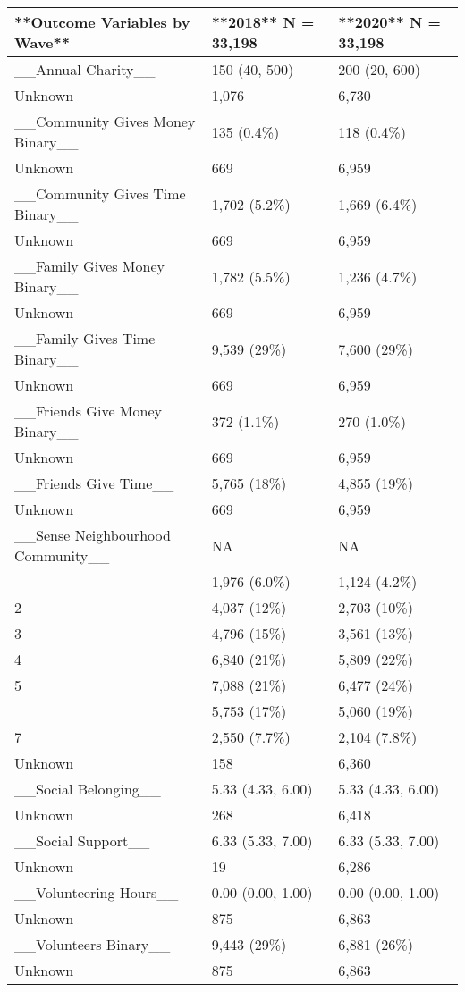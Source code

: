 \documentclass[
  single column]{article}
\begin{document}
\begin{table}
{\begin{tabular}[t]{lll}
\toprule
**Outcome Variables by Wave** & **2018**  
N = 33,198 & **2020**  
N = 33,198\\
\midrule
\_\_Annual Charity\_\_ & 150 (40, 500) & 200 (20, 600)\\
Unknown & 1,076 & 6,730\\
\_\_Community Gives Money Binary\_\_ & 135 (0.4\%) & 118 (0.4\%)\\
Unknown & 669 & 6,959\\
\_\_Community Gives Time Binary\_\_ & 1,702 (5.2\%) & 1,669 (6.4\%)\\
\addlinespace
Unknown & 669 & 6,959\\
\_\_Family Gives Money Binary\_\_ & 1,782 (5.5\%) & 1,236 (4.7\%)\\
Unknown & 669 & 6,959\\
\_\_Family Gives Time Binary\_\_ & 9,539 (29\%) & 7,600 (29\%)\\
Unknown & 669 & 6,959\\
\addlinespace
\_\_Friends Give Money Binary\_\_ & 372 (1.1\%) & 270 (1.0\%)\\
Unknown & 669 & 6,959\\
\_\_Friends Give Time\_\_ & 5,765 (18\%) & 4,855 (19\%)\\
Unknown & 669 & 6,959\\
\_\_Sense Neighbourhood Community\_\_ & NA & NA\\
\addlinespace
1 & 1,976 (6.0\%) & 1,124 (4.2\%)\\
2 & 4,037 (12\%) & 2,703 (10\%)\\
3 & 4,796 (15\%) & 3,561 (13\%)\\
4 & 6,840 (21\%) & 5,809 (22\%)\\
5 & 7,088 (21\%) & 6,477 (24\%)\\
\addlinespace
6 & 5,753 (17\%) & 5,060 (19\%)\\
7 & 2,550 (7.7\%) & 2,104 (7.8\%)\\
Unknown & 158 & 6,360\\
\_\_Social Belonging\_\_ & 5.33 (4.33, 6.00) & 5.33 (4.33, 6.00)\\
Unknown & 268 & 6,418\\
\addlinespace
\_\_Social Support\_\_ & 6.33 (5.33, 7.00) & 6.33 (5.33, 7.00)\\
Unknown & 19 & 6,286\\
\_\_Volunteering Hours\_\_ & 0.00 (0.00, 1.00) & 0.00 (0.00, 1.00)\\
Unknown & 875 & 6,863\\
\_\_Volunteers Binary\_\_ & 9,443 (29\%) & 6,881 (26\%)\\
\addlinespace
Unknown & 875 & 6,863\\
\bottomrule
\end{tabular}

}

\end{table}%
\end{document}
